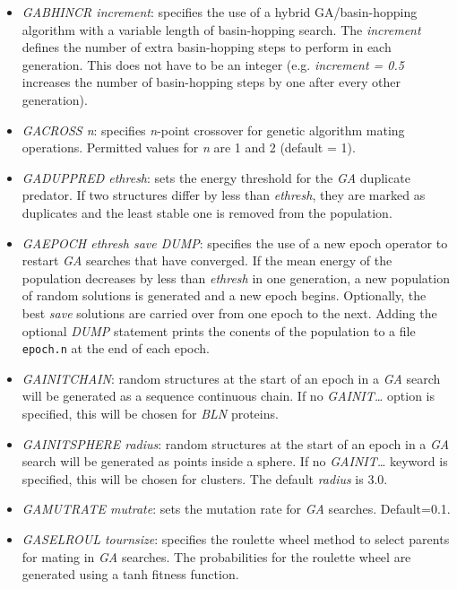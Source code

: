 \documentclass[12pt,a4paper,dvips]{article}
\begin{document}
\begin{itemize}
\item {\it GABHINCR increment\/}: specifies the use of a hybrid
GA/basin-hopping algorithm with a variable length of basin-hopping search. The
{\it increment} defines the number of extra basin-hopping steps to perform in
each generation. This does not have to be an integer (e.g. {\it increment =
0.5} increases the number of basin-hopping steps by one after every other
generation).

\item {\it GACROSS n}: specifies {\it n}-point crossover for genetic algorithm
mating operations. Permitted values for {\it n} are 1 and 2 (default = 1).

\item {\it GADUPPRED ethresh\/}: sets the energy threshold for the {\it GA}
duplicate predator. If two structures differ by less than {\it ethresh\/}, they are marked as duplicates and the least stable one is
removed from the population.

\item {\it GAEPOCH ethresh save DUMP\/}: specifies the use of a new epoch
operator to restart {\it GA} searches that have converged. If the mean energy of
the population decreases by less than {\it ethresh} in one generation, a new
population of random solutions is generated and a new epoch begins. Optionally,
the best {\it save} solutions are carried over from one epoch to the next.
Adding the optional {\it DUMP} statement prints the conents of the population to
a file {\tt epoch.n} at the end of each epoch.

\item {\it GAINITCHAIN\/}: random structures at the start of an epoch
in a {\it GA} search will be generated as a sequence continuous chain. If
no {\it GAINIT\ldots} option is specified, this will be chosen for {\it BLN}
proteins.

\item {\it GAINITSPHERE radius\/}: random structures at the start of an epoch
in a {\it GA} search will be generated as points inside a sphere.  If
no {\it GAINIT\ldots} keyword is specified, this will be chosen for clusters.
The default {\it radius\/} is 3.0.

\item {\it GAMUTRATE mutrate\/}: sets the mutation rate for {\it GA}
searches. Default=0.1.

\item {\it GASELROUL tournsize\/}: specifies the roulette wheel method to select
parents for mating in {\it GA} searches. The probabilities for the roulette
wheel are generated using a tanh fitness function.


\end{itemize}
\end{document}
